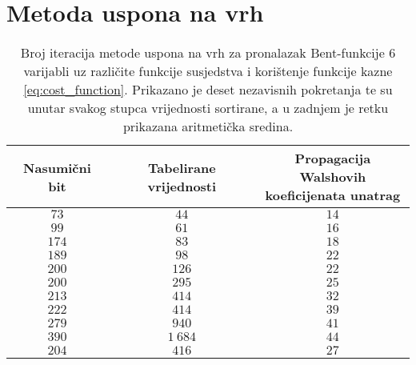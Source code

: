 \section{Metoda uspona na vrh}
\begin{table}[]
    \centering
    \captionsetup{justification=centering}
    \caption{Broj iteracija metode uspona na vrh za pronalazak Bent-funkcije $6$ varijabli uz različite funkcije susjedstva i korištenje funkcije kazne \eqref{eq:cost_function}. Prikazano je deset nezavisnih pokretanja te su unutar svakog stupca vrijednosti sortirane, a u zadnjem je retku prikazana aritmetička sredina.}
    \begin{tabular}{ccc} \hline
        Nasumični bit & Tabelirane vrijednosti & \makecell{Propagacija Walshovih \\ koeficijenata unatrag} \\ \hline
         $73$ &     $44$ & $14$ \\
         $99$ &     $61$ & $16$ \\
        $174$ &     $83$ & $18$ \\
        $189$ &     $98$ & $22$ \\
        $200$ &    $126$ & $22$ \\
        $200$ &    $295$ & $25$ \\
        $213$ &    $414$ & $32$ \\
        $222$ &    $414$ & $39$ \\
        $279$ &    $940$ & $41$ \\
        $390$ & $1\:684$ & $44$ \\ \hline
        $204$ &    $416$ & $27$
    \end{tabular}
    \label{tbl:greedy_6}
\end{table}


